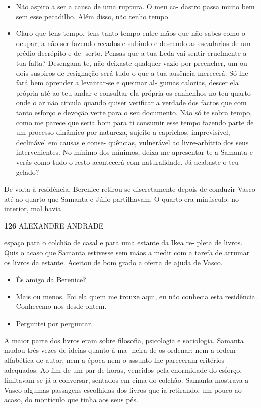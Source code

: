 \begin{itemize}
\tightlist
\item
  Não aspiro a ser a causa de uma ruptura. O meu ca- dastro passa muito
  bem sem esse pecadilho. Além disso, não tenho tempo.
\item
  Claro que tens tempo, tens tanto tempo entre mãos que não sabes como o
  ocupar, a não ser fazendo recados e subindo e descendo as escadarias
  de um prédio decrépito e de- serto. Pensas que a tua Leda vai sentir
  cruelmente a tua falta? Desengana-te, não deixaste qualquer vazio por
  preencher, um ou dois suspiros de resignação será tudo o que a tua
  ausência merecerá. Só lhe fará bem aprender a levantar-se e queimar
  al- gumas calorias, descer ela própria até ao teu andar e consultar
  ela própria os canhenhos no teu quarto onde o ar não circula quando
  quiser verificar a verdade dos factos que com tanto esforço e devoção
  verte para o seu documento. Não só te sobra tempo, como me parece que
  seria bom para ti consumir esse tempo fazendo parte de um processo
  dinâmico por natureza, sujeito a caprichos, imprevisível, declinável
  em causas e conse- quências, vulnerável ao livre-arbítrio dos seus
  intervenientes. No mínimo dos mínimos, deixa-me apresentar-te a
  Samanta e verás como tudo o resto acontecerá com naturalidade. Já
  acabaste o teu gelado?
\end{itemize}

De volta à residência, Berenice retirou-se discretamente depois de
conduzir Vasco até ao quarto que Samanta e Júlio partilhavam. O quarto
era minúsculo: no interior, mal havia

\textbf{126 }ALEXANDRE ANDRADE

espaço para o colchão de casal e para uma estante da Ikea re- pleta de
livros. Quis o acaso que Samanta estivesse sem mãos a medir com a tarefa
de arrumar os livros da estante. Aceitou de bom grado a oferta de ajuda
de Vasco.

\begin{itemize}
\tightlist
\item
  És amigo da Berenice?
\item
  Mais ou menos. Foi ela quem me trouxe aqui, eu não conhecia esta
  residência. Conhecemo-nos desde ontem.
\item
  Perguntei por perguntar.
\end{itemize}

A maior parte dos livros eram sobre filosofia, psicologia e sociologia.
Samanta mudou três vezes de ideias quanto à ma- neira de os ordenar: nem
a ordem alfabética de autor, nem a época nem o assunto lhe pareceram
critérios adequados. Ao fim de um par de horas, vencidos pela enormidade
do esforço, limitavam-se já a conversar, sentados em cima do colchão.
Samanta mostrava a Vasco algumas passagens escolhidas dos livros que ia
retirando, um pouco ao acaso, do montículo que tinha aos seus pés.

